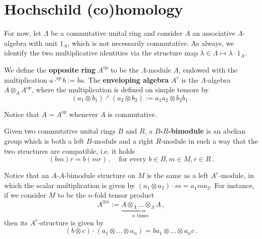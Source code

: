 
\section{Hochschild (co)homology}

	
	For now, let $\Lambda$ be a commutative unital ring
	and consider $A$ an associative $\Lambda$-algebra with unit $1_{A}$,
	which is not necessarily commutative.
	As always, we identify the two multiplicative identities via the
	structure map $\lambda \in \Lambda \mapsto \lambda \cdot 1_{A}$.
	
	\begin{df}
		We define the \textbf{opposite ring} $A^{op}$ to be the $\Lambda$-module $A$,
		endowed with the multiplication $a \cdot^{op} b := ba$.
		The \textbf{enveloping algebra} $A^{e}$ is the $\Lambda$-algebra
		$A \otimes_{\Lambda} A^{op}$, where the multiplication
		is defined on simple tensors by
		\begin{equation*}
			(a_{1} \otimes b_{1}) \cdot^{e} (a_{2}\otimes b_{2})
			:= a_{1}a_{2} \otimes b_{2}b_{1}\,.
		\end{equation*}
	\end{df}
	
	\begin{rmk}
		Notice that $A = A^{op}$ whenever $A$ is commutative.
	\end{rmk}
	
	\begin{df}
		Given two commutative unital rings $B$ and $R$,
		a \textbf{$B$-$R$-bimodule} is an abelian group
		which is both a left $B$-module and a right $R$-module
		in such a way that the two structures are compatible,
		i.e. it holds
		\begin{equation*}
			(bm)r = b(mr)\,, \quad \text{for every } b \in B, m \in M, r \in R\,.
		\end{equation*}
	\end{df}
	
	Notice that an $A$-$A$-bimodule structure on $M$ is the same as 
	a left $A^{e}$-module, in which the scalar multiplication is given
	by $(a_{1} \otimes a_{2}) \cdot m = a_{1} m a_{2}$.
	For instance, if we consider $M$ to be the $n$-fold tensor product
	\begin{equation*}
		A^{\otimes n} := \underbrace{A \otimes_{\Lambda} \dots \otimes_{\Lambda} A}_{n \text{ times }}\,,
	\end{equation*}
	then its $A^{e}$-structure is given by
	\begin{equation*}
		(b \otimes c) \cdot (a_{1} \otimes \dots \otimes a_{n})
		= ba_{1} \otimes \dots \otimes a_{n}c\,.
	\end{equation*}
	
